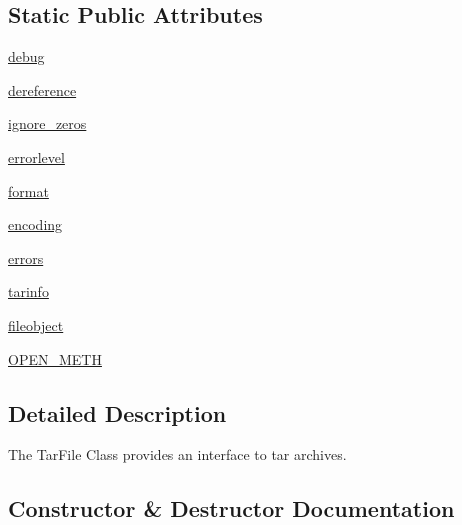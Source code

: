 \subsection*{Static Public Attributes}
\begin{DoxyCompactItemize}
\item 
\hyperlink{classpip_1_1__vendor_1_1distlib_1_1__backport_1_1tarfile_1_1TarFile_a2adb91333d89bd85d04752ad01ed3d39}{debug}
\item 
\hyperlink{classpip_1_1__vendor_1_1distlib_1_1__backport_1_1tarfile_1_1TarFile_a9dd07718f889b71b64dba115e4d39c39}{dereference}
\item 
\hyperlink{classpip_1_1__vendor_1_1distlib_1_1__backport_1_1tarfile_1_1TarFile_a74dcdedfa984d9ea4d151edbe292d850}{ignore\+\_\+zeros}
\item 
\hyperlink{classpip_1_1__vendor_1_1distlib_1_1__backport_1_1tarfile_1_1TarFile_a1d7a1e24b458924e167e39de6c75ebba}{errorlevel}
\item 
\hyperlink{classpip_1_1__vendor_1_1distlib_1_1__backport_1_1tarfile_1_1TarFile_a9c5c8e1299a97874f045355e85281fa3}{format}
\item 
\hyperlink{classpip_1_1__vendor_1_1distlib_1_1__backport_1_1tarfile_1_1TarFile_a2a54c780ca78f47e256db4118dffec23}{encoding}
\item 
\hyperlink{classpip_1_1__vendor_1_1distlib_1_1__backport_1_1tarfile_1_1TarFile_a386bb6cf8e34f25c9b782f1e77f3c949}{errors}
\item 
\hyperlink{classpip_1_1__vendor_1_1distlib_1_1__backport_1_1tarfile_1_1TarFile_ae223b4ec779d586f7f5da904f04fde33}{tarinfo}
\item 
\hyperlink{classpip_1_1__vendor_1_1distlib_1_1__backport_1_1tarfile_1_1TarFile_a4c66e42c1d2502e3f4c5805adc624898}{fileobject}
\item 
\hyperlink{classpip_1_1__vendor_1_1distlib_1_1__backport_1_1tarfile_1_1TarFile_a5cd0ef28e2fa431ef0a424bcc708b72a}{O\+P\+E\+N\+\_\+\+M\+E\+TH}
\end{DoxyCompactItemize}


\subsection{Detailed Description}
\begin{DoxyVerb}The TarFile Class provides an interface to tar archives.
\end{DoxyVerb}
 

\subsection{Constructor \& Destructor Documentation}
\mbox{\label{classpip_1_1__vendor_1_1distlib_1_1__backport_1_1tarfile_1_1TarFile_a1dda6d9be63b3ae8186ae388015c11ff}} 
